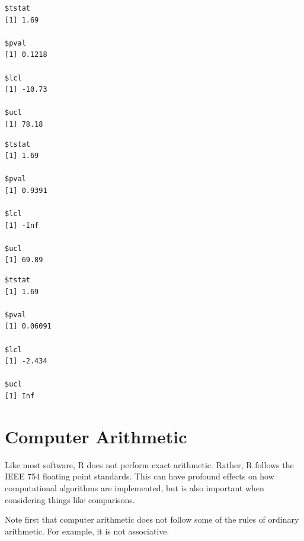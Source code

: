 \documentclass[
]{krantz}
\makeatletter
\newenvironment{Shaded}{\begin{snugshade}}{\end{snugshade}}
\newcommand{\DataTypeTok}[1]{\textcolor[rgb]{0.27,0.27,0.27}{#1}}
\newcommand{\KeywordTok}[1]{\textcolor[rgb]{0.27,0.27,0.27}{\textbf{#1}}}
\newcommand{\NormalTok}[1]{#1}
\newcommand{\OperatorTok}[1]{\textcolor[rgb]{0.43,0.43,0.43}{\textbf{#1}}}
\newcommand{\StringTok}[1]{\textcolor[rgb]{0.5,0.5,0.5}{#1}}
\newenvironment{kframe}{%
\medskip{}
\setlength{\fboxsep}{.8em}
 \def\at@end@of@kframe{}%
 \ifinner\ifhmode%
  \def\at@end@of@kframe{\end{minipage}}%
  \begin{minipage}{\columnwidth}%
 \fi\fi%
 \def\FrameCommand##1{\hskip\@totalleftmargin \hskip-\fboxsep
 \colorbox{shadecolor}{##1}\hskip-\fboxsep
     \hskip-\linewidth \hskip-\@totalleftmargin \hskip\columnwidth}%
 \MakeFramed {\advance\hsize-\width
   \@totalleftmargin\z@ \linewidth\hsize
   \@setminipage}}%
 {\par\unskip\endMakeFramed%
 \at@end@of@kframe}
\renewenvironment{Shaded}{\begin{kframe}}{\end{kframe}}
\makeatother
\begin{document}
\begin{verbatim}
$tstat
[1] 1.69

$pval
[1] 0.1218

$lcl
[1] -10.73

$ucl
[1] 78.18
\end{verbatim}

\begin{Shaded}
\end{Shaded}

\begin{verbatim}
$tstat
[1] 1.69

$pval
[1] 0.9391

$lcl
[1] -Inf

$ucl
[1] 69.89
\end{verbatim}

\begin{Shaded}
\end{Shaded}

\begin{verbatim}
$tstat
[1] 1.69

$pval
[1] 0.06091

$lcl
[1] -2.434

$ucl
[1] Inf
\end{verbatim}

\hypertarget{arith}{%
\section{Computer Arithmetic}\label{arith}}

Like most software, R does not perform exact arithmetic. Rather, R follows the IEEE 754 floating point standards. This can have profound effects on how computational algorithms are implemented, but is also important when considering things like comparisons.

Note first that computer arithmetic does not follow some of the rules of ordinary arithmetic. For example, it is not associative.
\end{document}
